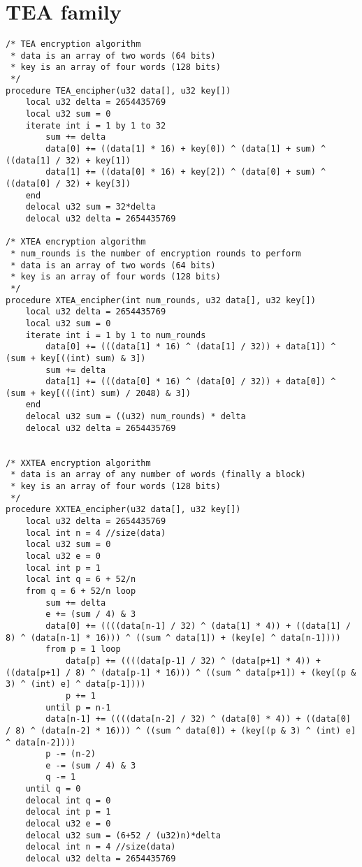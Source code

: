 \documentclass[a4paper,10pt,openright]{memoir}
\begin{document}
\section{TEA family}
\begin{lstlisting}[language=Janus,breaklines=true]
/* TEA encryption algorithm
 * data is an array of two words (64 bits)
 * key is an array of four words (128 bits)
 */
procedure TEA_encipher(u32 data[], u32 key[])
    local u32 delta = 2654435769
    local u32 sum = 0
    iterate int i = 1 by 1 to 32
        sum += delta
        data[0] += ((data[1] * 16) + key[0]) ^ (data[1] + sum) ^ ((data[1] / 32) + key[1])
        data[1] += ((data[0] * 16) + key[2]) ^ (data[0] + sum) ^ ((data[0] / 32) + key[3])
    end
    delocal u32 sum = 32*delta
    delocal u32 delta = 2654435769

/* XTEA encryption algorithm
 * num_rounds is the number of encryption rounds to perform
 * data is an array of two words (64 bits)
 * key is an array of four words (128 bits)
 */
procedure XTEA_encipher(int num_rounds, u32 data[], u32 key[])
    local u32 delta = 2654435769
    local u32 sum = 0
    iterate int i = 1 by 1 to num_rounds
        data[0] += (((data[1] * 16) ^ (data[1] / 32)) + data[1]) ^ (sum + key[((int) sum) & 3])
        sum += delta
        data[1] += (((data[0] * 16) ^ (data[0] / 32)) + data[0]) ^ (sum + key[(((int) sum) / 2048) & 3])
    end
    delocal u32 sum = ((u32) num_rounds) * delta
    delocal u32 delta = 2654435769


/* XXTEA encryption algorithm
 * data is an array of any number of words (finally a block)
 * key is an array of four words (128 bits)
 */
procedure XXTEA_encipher(u32 data[], u32 key[])
    local u32 delta = 2654435769
    local int n = 4 //size(data)
    local u32 sum = 0
    local u32 e = 0
    local int p = 1
    local int q = 6 + 52/n
    from q = 6 + 52/n loop
        sum += delta
        e += (sum / 4) & 3
        data[0] += ((((data[n-1] / 32) ^ (data[1] * 4)) + ((data[1] / 8) ^ (data[n-1] * 16))) ^ ((sum ^ data[1]) + (key[e] ^ data[n-1])))
        from p = 1 loop
            data[p] += ((((data[p-1] / 32) ^ (data[p+1] * 4)) + ((data[p+1] / 8) ^ (data[p-1] * 16))) ^ ((sum ^ data[p+1]) + (key[(p & 3) ^ (int) e] ^ data[p-1])))
            p += 1
        until p = n-1
        data[n-1] += ((((data[n-2] / 32) ^ (data[0] * 4)) + ((data[0] / 8) ^ (data[n-2] * 16))) ^ ((sum ^ data[0]) + (key[(p & 3) ^ (int) e] ^ data[n-2])))
        p -= (n-2)
        e -= (sum / 4) & 3
        q -= 1
    until q = 0
    delocal int q = 0
    delocal int p = 1
    delocal u32 e = 0
    delocal u32 sum = (6+52 / (u32)n)*delta
    delocal int n = 4 //size(data)
    delocal u32 delta = 2654435769



\end{lstlisting}
\end{document}
